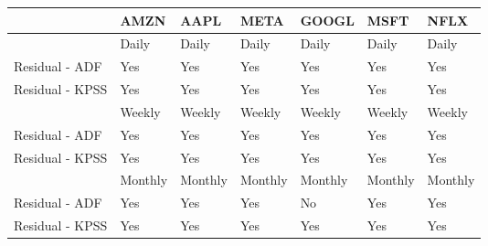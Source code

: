 \begin{tabular}{lllllll}
\toprule
{} &     AMZN &     AAPL &     META &    GOOGL &     MSFT &     NFLX \\
\midrule
                &    Daily &    Daily &    Daily &    Daily &    Daily &    Daily \\
Residual - ADF  &      Yes &      Yes &      Yes &      Yes &      Yes &      Yes \\
Residual - KPSS &      Yes &      Yes &      Yes &      Yes &      Yes &      Yes \\
                &   Weekly &   Weekly &   Weekly &   Weekly &   Weekly &   Weekly \\
Residual - ADF  &      Yes &      Yes &      Yes &      Yes &      Yes &      Yes \\
Residual - KPSS &      Yes &      Yes &      Yes &      Yes &      Yes &      Yes \\
                &  Monthly &  Monthly &  Monthly &  Monthly &  Monthly &  Monthly \\
Residual - ADF  &      Yes &      Yes &      Yes &       No &      Yes &      Yes \\
Residual - KPSS &      Yes &      Yes &      Yes &      Yes &      Yes &      Yes \\
\bottomrule
\end{tabular}
